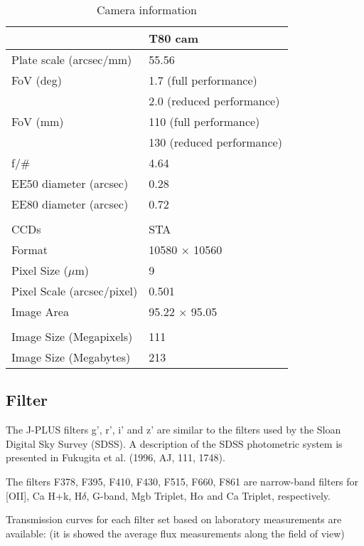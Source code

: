 \documentclass[12pt,preprint]{aastex}
\begin{document}
\begin{table*}
 \centering
   \label{table:result}
    \begin{minipage}{140mm}
\caption{Camera information}   
                       
\begin{tabular}{l l}     %
\hline\hline       
  &T80 cam   \\
\hline                    
Plate scale (arcsec/mm)      &  55.56 \\
FoV (deg) &  1.7 (full performance)\\
  & 2.0 (reduced performance) \\
 FoV (mm) & 110 (full performance)   \\
 & 130 (reduced performance) \\
 f/$\#$ & 4.64 \\
 EE50 diameter (arcsec) & 0.28 \\
 EE80 diameter (arcsec) & 0.72 \\
  & \\
 CCDs & STA \\
 Format & 10580 $\times$ 10560 \\
 Pixel Size ($\mu$m) & 9 \\
 Pixel Scale (arcsec/pixel) & 0.501 \\
 Image Area & 95.22 $\times$ 95.05 \\
 & \\
 Image Size (Megapixels) & 111 \\
 Image Size (Megabytes) & 213 \\
\hline                  
\end{tabular}
\end{minipage}
\end{table*}   

\subsection{Filter}

The J-PLUS filters g', r', i' and z' are similar to the filters used by the Sloan Digital Sky Survey (SDSS).  A description of the SDSS photometric system is presented in Fukugita et al. (1996, AJ, 111, 1748).

The filters F378, F395, F410, F430, F515, F660, F861 are narrow-band filters for [OII], Ca H+k, H$\delta$, G-band, Mgb Triplet, H$\alpha$ and Ca Triplet, respectively.

Transmission curves for each filter set based on laboratory measurements are available: 
(it is showed the average flux measurements along the field of view)
\end{document}
